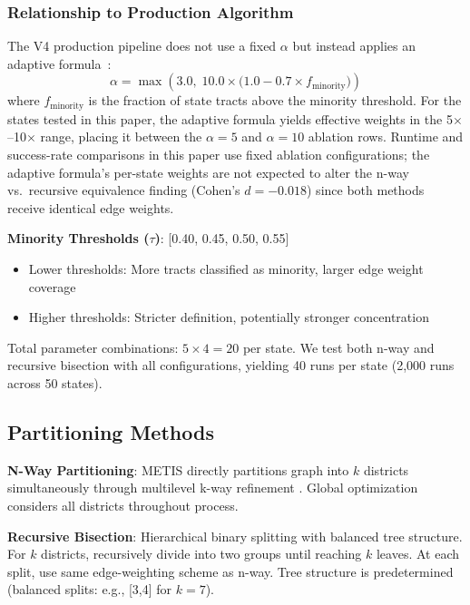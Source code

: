 \subsubsection{Relationship to Production Algorithm}

The V4 production pipeline does not use a fixed $\alpha$ but instead applies an adaptive formula~\citep{dellaLibera2026D0}:
\begin{equation}
\alpha = \max\!\left(3.0,\; 10.0 \times \bigl(1.0 - 0.7 \times f_{\text{minority}}\bigr)\right)
\label{eq:adaptive_boost_d2}
\end{equation}
where $f_{\text{minority}}$ is the fraction of state tracts above the minority threshold. For the states tested in this paper, the adaptive formula yields effective weights in the 5$\times$--10$\times$ range, placing it between the $\alpha=5$ and $\alpha=10$ ablation rows. Runtime and success-rate comparisons in this paper use fixed ablation configurations; the adaptive formula's per-state weights are not expected to alter the n-way vs.\ recursive equivalence finding (Cohen's $d = -0.018$) since both methods receive identical edge weights.

\textbf{Minority Thresholds ($\tau$)}: [0.40, 0.45, 0.50, 0.55]
\begin{itemize}
\item Lower thresholds: More tracts classified as minority, larger edge weight coverage
\item Higher thresholds: Stricter definition, potentially stronger concentration
\end{itemize}

Total parameter combinations: $5 \times 4 = 20$ per state. We test both n-way and recursive bisection with all configurations, yielding 40 runs per state (2,000 runs across 50 states).

\subsection{Partitioning Methods}

\textbf{N-Way Partitioning}: METIS directly partitions graph into $k$ districts simultaneously through multilevel k-way refinement \citep{karypis1998}. Global optimization considers all districts throughout process.

\textbf{Recursive Bisection}: Hierarchical binary splitting with balanced tree structure. For $k$ districts, recursively divide into two groups until reaching $k$ leaves. At each split, use same edge-weighting scheme as n-way. Tree structure is predetermined (balanced splits: e.g., [3,4] for $k=7$).

